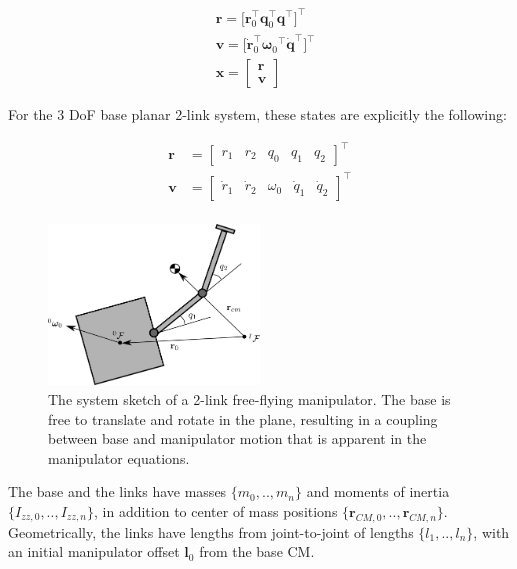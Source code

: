 \documentclass[letterpaper, 10 pt, conference]{ieeeconf}  %
\begin{document}
\begin{align}
	& \mathbf{r} = \lbrack  \mathbf{r}_0^\top \mathbf{q}_0^\top \mathbf{q}^\top \rbrack ^\top \\
	& \mathbf{v} = \lbrack \dot{\mathbf{r}}_0^\top {\bm{\omega}_0}^\top \dot{\mathbf{q}}^\top \rbrack ^\top \\
	& \mathbf{x} = \begin{bmatrix} \mathbf{r} \\ \mathbf{v} \end{bmatrix}
\end{align}

For the 3 DoF base planar 2-link system, these states are explicitly the following:

\begin{align}
	\mathbf{r} &= 
	\begin{bmatrix}r_1 & r_2 & q_0 & q_1 & q_2\end{bmatrix}^\top\\
	\mathbf{v}  &=  
	\begin{bmatrix}\dot{r}_1 & \dot{r}_2 & \omega_0 & \dot{q}_1 & \dot{q}_2 \end{bmatrix}^\top\\
\end{align}

\begin{figure}[h]
	\includegraphics[width=0.5\textwidth]{system.png}
	\caption{The system sketch of a 2-link free-flying manipulator. The base is free to translate and rotate in the plane, resulting in a coupling between base and manipulator motion that is apparent in the manipulator equations.}
	\label{fig:sys}
\end{figure}

The base and the links have masses $\{m_0, .., m_n\}$ and moments of inertia $\{I_{zz,0}, .., I_{zz,n}\}$, in addition to center of mass positions $\{\mathbf{r}_{CM,0}, .., \mathbf{r}_{CM,n}\}$. Geometrically, the links have lengths from joint-to-joint of lengths $\{l_1, .., l_n\}$, with an initial manipulator offset $\mathbf{l}_0$ from the base CM.
\end{document}
